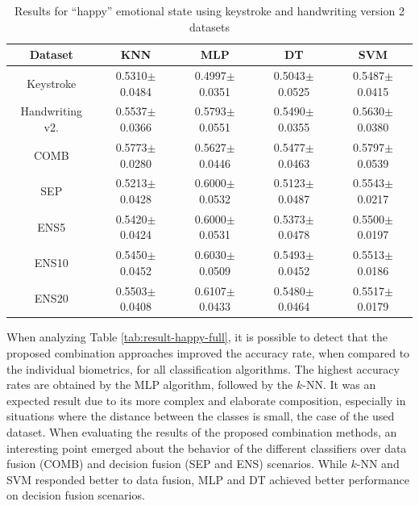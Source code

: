 \documentclass[conference]{IEEEtran}
\begin{document}
\begin{table}
    \centering
    \caption{Results for ``happy'' emotional state  using keystroke and handwriting version 2 datasets}
    \label{tab:result-happy-dynamic}
    \begin{tabular}{|c|c|c|c|c|}
\hline
\textbf{Dataset}          & \textbf{KNN}        & \textbf{MLP}        & \textbf{DT}         & \textbf{SVM}        \\ \hline
Keystroke            & 0.5310$\pm$0.0484 & 0.4997$\pm$0.0351 & 0.5043$\pm$0.0525 & 0.5487$\pm$0.0415 \\ \hline
Handwriting v2. & 0.5537$\pm$0.0366 & 0.5793$\pm$0.0551 & 0.5490$\pm$0.0355 & 0.5630$\pm$0.0380 \\ \hline
COMB               & 0.5773$\pm$0.0280 & 0.5627$\pm$0.0446 & 0.5477$\pm$0.0463 & 0.5797$\pm$0.0539 \\ \hline
SEP              & 0.5213$\pm$0.0428 & 0.6000$\pm$0.0532 & 0.5123$\pm$0.0487 & 0.5543$\pm$0.0217 \\ \hline
ENS5 & 0.5420$\pm$0.0424 & 0.6000$\pm$0.0531 & 0.5373$\pm$0.0478 & 0.5500$\pm$0.0197 \\ \hline
ENS10 & 0.5450$\pm$0.0452 & 0.6030$\pm$0.0509 & 0.5493$\pm$0.0452 & 0.5513$\pm$0.0186 \\ \hline
ENS20 & 0.5503$\pm$0.0408 & 0.6107$\pm$0.0433 & 0.5480$\pm$0.0464 & 0.5517$\pm$0.0179 \\ \hline
\end{tabular}%
\end{table}


When analyzing Table \ref{tab:result-happy-full}, it is possible to detect that the proposed combination approaches improved the accuracy rate, when compared to the individual biometrics, for all classification algorithms. The highest accuracy rates are obtained by the MLP algorithm, followed by the $k$-NN. It was an expected result due to its more complex and elaborate composition, especially in situations where the distance between the classes is small, the case of the used dataset. 
When evaluating the results of the proposed combination methods, an interesting point emerged about the behavior of the different classifiers over data fusion (COMB) and decision fusion (SEP and ENS) scenarios. While $k$-NN and SVM responded better to data fusion, MLP and DT achieved better performance on decision fusion scenarios.
\end{document}
